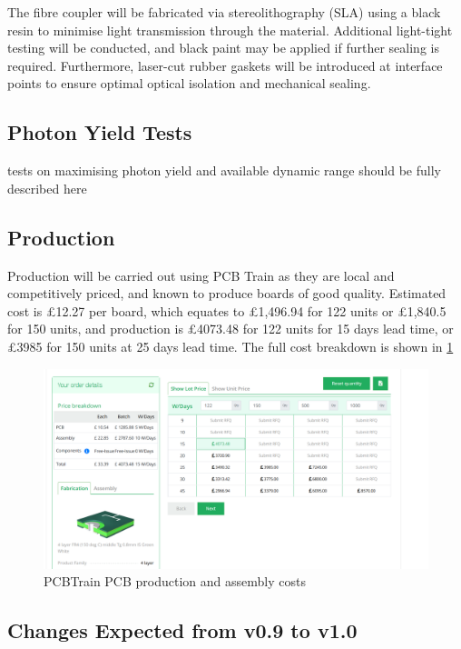 \documentclass[a4paper,11pt]{article}
\begin{document}
The fibre coupler will be fabricated via stereolithography (SLA) using a black resin to minimise light transmission through the material. Additional light-tight testing will be conducted, and black paint may be applied if further sealing is required. Furthermore, laser-cut rubber gaskets will be introduced at interface points to ensure optimal optical isolation and mechanical sealing.

\subsection{Photon Yield Tests}
{\color{red} tests on maximising photon yield and available dynamic range should be fully described here}

\subsection{Production}

Production will be carried out using PCB Train as they are local and competitively priced, and known to produce boards of good quality. Estimated cost is £12.27 per board, which equates to £1,496.94 for 122 units or £1,840.5 for 150 units, and production is £4073.48 for 122 units for 15 days lead time, or £3985 for 150 units at 25 days lead time. The full cost breakdown is shown in \cref{fig:PCBTrainOrder}

\begin{figure}[htbp]
\centering
\includegraphics[scale=0.5]{PCBTrainOrder.png}
\caption{PCBTrain PCB production and assembly costs\label{fig:PCBTrainOrder}}
\end{figure}


\subsection{Changes Expected from v0.9 to v1.0}\label{ImGoingThroughChanges}
\end{document}
